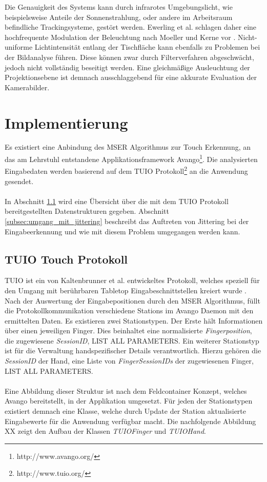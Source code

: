 Die Genauigkeit des Systems kann durch infrarotes Umgebungslicht, wie beispielsweise Anteile der Sonnenstrahlung, oder andere im Arbeitsraum befindliche Trackingsysteme, gestört werden. Ewerling et al. schlagen daher eine hochfrequente Modulation der Beleuchtung nach Moeller und Kerne vor \cite{ewerling:2012, moeller:2012}.  Nicht-uniforme Lichtintensität entlang der Tischfläche kann ebenfalls zu Problemen bei der Bildanalyse führen. Diese können zwar durch Filterverfahren abgeschwächt, jedoch nicht vollständig beseitigt werden. Eine gleichmäßige Ausleuchtung der Projektionsebene ist demnach ausschlaggebend für eine akkurate Evaluation der Kamerabilder.


\section{Implementierung}
\label{sec:implementierung_mser}
Es existiert eine Anbindung des MSER Algorithmus zur Touch Erkennung, an das am Lehrstuhl entstandene Applikationsframework Avango\footnote{http://www.avango.org/}. Die analysierten Eingabedaten werden basierend auf dem TUIO Protokoll\footnote{http://www.tuio.org/} an die Anwendung gesendet.
\\\\
In Abschnitt \ref{subsec:tuio_touch_protokoll} wird eine Übersicht über die mit dem TUIO Protokoll bereitgestellten Datenstrukturen gegeben. Abschnitt \ref{subsec:umgang_mit_jittering} beschreibt das Auftreten von Jittering bei der Eingabeerkennung und wie mit diesem Problem umgegangen werden kann.


\subsection{TUIO Touch Protokoll}
\label{subsec:tuio_touch_protokoll}

TUIO ist ein von Kaltenbrunner et al. entwickeltes Protokoll, welches speziell für den Umgang mit berührbaren Tabletop Eingabeschnittstellen kreiert wurde \cite{kaltenbrunner:2005}. Nach der Auswertung der Eingabepositionen durch den MSER Algorithmus, füllt die Protokollkommunikation verschiedene Stations im Avango Daemon mit den ermittelten Daten. Es existieren zwei Stationstypen. Der Erste hält Informationen über einen jeweiligen Finger. Dies beinhaltet eine normalisierte \emph{Fingerposition}, die zugewiesene \emph{SessionID}, LIST ALL PARAMETERS. Ein weiterer Stationstyp ist für die Verwaltung handspezifischer Details verantwortlich. Hierzu gehören die \emph{SessionID} der Hand, eine Liste von \emph{FingerSessionIDs} der zugewiesenen Finger, LIST ALL PARAMETERS.
\\\\
Eine Abbildung dieser Struktur ist nach dem Feldcontainer Konzept, welches Avango bereitstellt, in der Applikation umgesetzt. Für jeden der Stationstypen existiert demnach eine Klasse, welche durch Update der Station aktualisierte Eingabewerte für die Anwendung verfügbar macht. Die nachfolgende Abbildung XX zeigt den Aufbau der Klassen \emph{TUIOFinger} und \emph{TUIOHand}.


